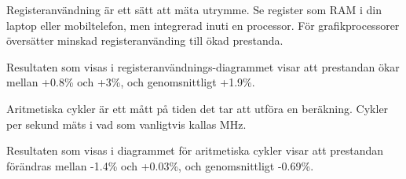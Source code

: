 \documentclass[12pt,a4paper,onecolumn,openright]{report}
\begin{document}
\begin{multicols}{2}
Registeranvändning är ett sätt att mäta utrymme. Se register som RAM i din laptop eller mobiltelefon, men integrerad inuti en processor. För grafikprocessorer översätter minskad registeranvänding till ökad prestanda.

Resultaten som visas i registeranvändnings-diagrammet visar att prestandan ökar mellan +0.8\% och +3\%, och genomsnittligt +1.9\%.

\begin{figure}[H]
\label{plot:a_cycles}
\end{figure}

Aritmetiska cykler är ett mått på tiden det tar att utföra en beräkning. Cykler per sekund mäts i vad som vanligtvis kallas MHz.

Resultaten som visas i diagrammet för aritmetiska cykler visar att prestandan förändras mellan -1.4\% och +0.03\%, och genomsnittligt -0.69\%.



\end{multicols}
\end{document}
